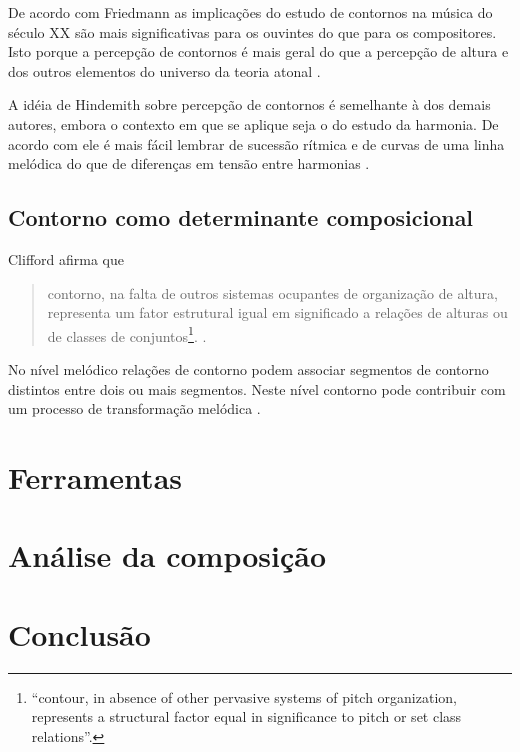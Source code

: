 \documentclass[12pt,brazil]{book}
\newcommand{\citacaoindt}[4]{
  \begin{quote}
    \normalsize
    {#2}\footnote{
      \selectlanguage{brazil}
      ``{#1}''.
    }.
    \selectlanguage{brazil}
    \cite[#3]{#4}.
  \end{quote}
}
\begin{document}
De acordo com Friedmann as implicações do estudo de contornos na
música do século XX são mais significativas para os ouvintes do que
para os compositores. Isto porque a percepção de contornos é mais
geral do que a percepção de altura e dos outros elementos do universo
da teoria atonal \cite[p. 224]{friedmann85:methodology}.

A idéia de Hindemith sobre percepção de contornos é semelhante à dos
demais autores, embora o contexto em que se aplique seja o do estudo
da harmonia. De acordo com ele é mais fácil lembrar de sucessão
rítmica e de curvas de uma linha melódica do que de diferenças em
tensão entre harmonias \cite[p. 175]{hindemith41:craft}.

\section{Contorno como determinante composicional}
\label{sec:cont-como-determ}

Clifford afirma que

\citacaoindt{contour, in absence of other pervasive systems of pitch
  organization, represents a structural factor equal in significance
  to pitch or set class relations}{contorno, na falta de outros
  sistemas ocupantes de organização de altura, representa um fator
  estrutural igual em significado a relações de alturas ou de classes
  de conjuntos}{p. 157}{clifford95:contour}

No nível melódico relações de contorno podem associar segmentos de
contorno distintos entre dois ou mais segmentos. Neste nível contorno
pode contribuir com um processo de transformação melódica
\cite[p. 159]{clifford95:contour}.

\chapter{Ferramentas}
\label{cha:ferramentas}

\chapter{Análise da composição}
\label{cha:anal-da-comp}

\chapter{Conclusão}
\label{cha:conclusao}

\end{document}
